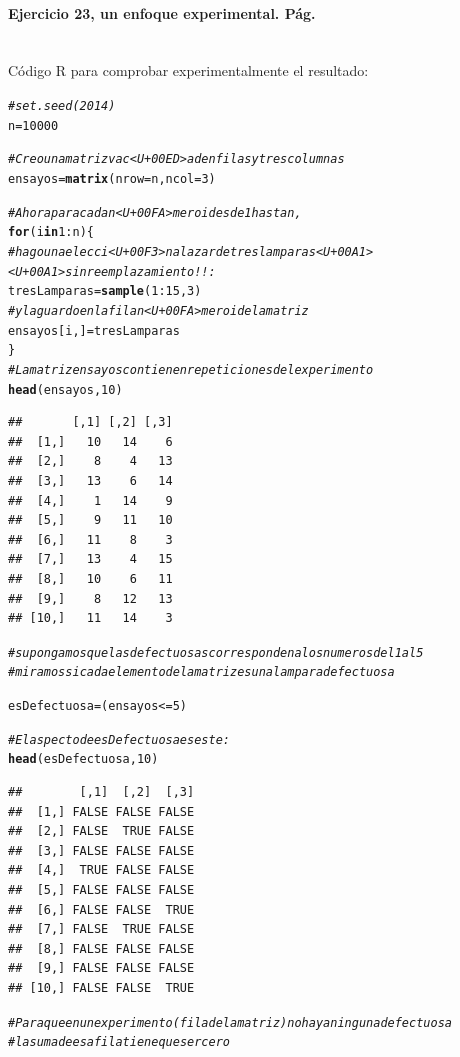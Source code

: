 \documentclass[10pt,a4paper]{article}\usepackage[]{graphicx}\usepackage[]{color}
\makeatletter
\newcommand{\hlnum}[1]{\textcolor[rgb]{0.686,0.059,0.569}{#1}}%
\newcommand{\hlcom}[1]{\textcolor[rgb]{0.678,0.584,0.686}{\textit{#1}}}%
\newcommand{\hlopt}[1]{\textcolor[rgb]{0,0,0}{#1}}%
\newcommand{\hlstd}[1]{\textcolor[rgb]{0.345,0.345,0.345}{#1}}%
\newcommand{\hlkwa}[1]{\textcolor[rgb]{0.161,0.373,0.58}{\textbf{#1}}}%
\newcommand{\hlkwb}[1]{\textcolor[rgb]{0.69,0.353,0.396}{#1}}%
\newcommand{\hlkwc}[1]{\textcolor[rgb]{0.333,0.667,0.333}{#1}}%
\newcommand{\hlkwd}[1]{\textcolor[rgb]{0.737,0.353,0.396}{\textbf{#1}}}%
\newenvironment{kframe}{%
 \def\at@end@of@kframe{}%
 \ifinner\ifhmode%
  \def\at@end@of@kframe{\end{minipage}}%
  \begin{minipage}{\columnwidth}%
 \fi\fi%
 \def\FrameCommand##1{\hskip\@totalleftmargin \hskip-\fboxsep
 \colorbox{shadecolor}{##1}\hskip-\fboxsep
     \hskip-\linewidth \hskip-\@totalleftmargin \hskip\columnwidth}%
 \MakeFramed {\advance\hsize-\width
   \@totalleftmargin\z@ \linewidth\hsize
   \@setminipage}}%
 {\par\unskip\endMakeFramed%
 \at@end@of@kframe}
\newenvironment{knitrout}{}{} %
\newcounter {cont01}
\makeatother
\begin{document}
\paragraph{Ejercicio 23, un enfoque experimental. Pág. \pageref{tut03:ejercicio22}}
\label{tut03:ejercicio22:sol}\quad\\
Código R para comprobar experimentalmente el resultado:
\begin{knitrout}
\color{fgcolor}\begin{kframe}
\begin{alltt}
\hlcom{#set.seed(2014)}
\hlstd{n} \hlkwb{=} \hlnum{10000}

\hlcom{# Creo una matriz vac<U+00ED>a de n filas y tres columnas}
\hlstd{ensayos} \hlkwb{=} \hlkwd{matrix}\hlstd{(}\hlkwc{nrow} \hlstd{= n,} \hlkwc{ncol} \hlstd{=} \hlnum{3}\hlstd{)}

\hlcom{# Ahora para cada n<U+00FA>mero i desde 1 hasta n,}
\hlkwa{for}\hlstd{(i} \hlkwa{in} \hlnum{1}\hlopt{:}\hlstd{n)\{}
\hlcom{# hago una elecci<U+00F3>n al azar de tres lamparas <U+00A1><U+00A1>sin reemplazamiento!!:}
\hlstd{tresLamparas} \hlkwb{=} \hlkwd{sample}\hlstd{(}\hlnum{1}\hlopt{:}\hlnum{15}\hlstd{,} \hlnum{3}\hlstd{)}
\hlcom{# y la guardo en la fila n<U+00FA>mero i de la matriz}
\hlstd{ensayos[i, ]} \hlkwb{=} \hlstd{tresLamparas}
\hlstd{\}}
\hlcom{# La matriz ensayos contiene n repeticiones del experimento}
\hlkwd{head}\hlstd{(ensayos,} \hlnum{10}\hlstd{)}
\end{alltt}
\begin{verbatim}
##       [,1] [,2] [,3]
##  [1,]   10   14    6
##  [2,]    8    4   13
##  [3,]   13    6   14
##  [4,]    1   14    9
##  [5,]    9   11   10
##  [6,]   11    8    3
##  [7,]   13    4   15
##  [8,]   10    6   11
##  [9,]    8   12   13
## [10,]   11   14    3
\end{verbatim}
\begin{alltt}
\hlcom{# supongamos que las defectuosas corresponden a los numeros del 1 al 5}
\hlcom{# miramos si cada elemento de la matriz es una lampara defectuosa}

\hlstd{esDefectuosa} \hlkwb{=} \hlstd{(ensayos}\hlopt{<=} \hlnum{5}\hlstd{)}

\hlcom{# El aspecto de esDefectuosa es este:}
\hlkwd{head}\hlstd{(esDefectuosa,} \hlnum{10}\hlstd{)}
\end{alltt}
\begin{verbatim}
##        [,1]  [,2]  [,3]
##  [1,] FALSE FALSE FALSE
##  [2,] FALSE  TRUE FALSE
##  [3,] FALSE FALSE FALSE
##  [4,]  TRUE FALSE FALSE
##  [5,] FALSE FALSE FALSE
##  [6,] FALSE FALSE  TRUE
##  [7,] FALSE  TRUE FALSE
##  [8,] FALSE FALSE FALSE
##  [9,] FALSE FALSE FALSE
## [10,] FALSE FALSE  TRUE
\end{verbatim}
\begin{alltt}
\hlcom{# Para que en un experimento (fila de la matriz) no haya ninguna defectuosa}
\hlcom{# la suma de esa fila tiene que ser cero}


\end{alltt}
\end{kframe}
\end{knitrout}
\end{document}
